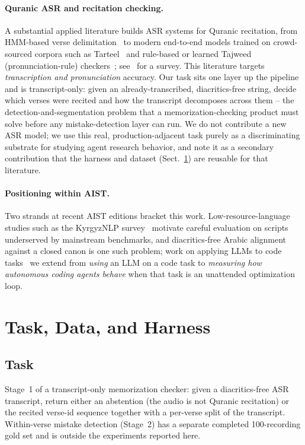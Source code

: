 \documentclass[runningheads]{llncs}
\begin{document}
\paragraph{Quranic ASR and recitation checking.}
A substantial applied literature builds ASR systems for Quranic
recitation, from HMM-based verse delimitation~\cite{tabbal2006recitation} to
modern end-to-end models trained on crowd-sourced corpora such as
Tarteel~\cite{yousfi2018tarteel,alharbi2026comparative} and rule-based or
learned Tajweed (pronunciation-rule) checkers~\cite{alagrami2021smartajweed};
see~\cite{farghaly2021asrreview} for a survey. This literature targets
\emph{transcription and pronunciation} accuracy. Our task sits one layer up
the pipeline and is transcript-only: given an already-transcribed,
diacritics-free string, decide which verses were recited and how the
transcript decomposes across them -- the detection-and-segmentation problem
that a memorization-checking product must solve before any mistake-detection
layer can run. We do not contribute a new ASR model; we use this real,
production-adjacent task purely as a discriminating substrate for studying
agent research behavior, and note it as a secondary contribution that the
harness and dataset (Sect.~\ref{sec:harness}) are reusable for that
literature.

\paragraph{Positioning within AIST.}
Two strands at recent AIST editions bracket this work. Low-resource-language
studies such as the KyrgyzNLP survey~\cite{alekseev2025kyrgyznlp} motivate
careful evaluation on scripts underserved by mainstream benchmarks, and
diacritics-free Arabic alignment against a closed canon is one such problem;
work on applying LLMs to code tasks~\cite{andryushchenko2024codeqa} we extend
from \emph{using} an LLM on a code task to \emph{measuring how autonomous
coding agents behave} when that task is an unattended optimization loop.

\section{Task, Data, and Harness}
\label{sec:harness}

\subsection{Task}
Stage~1 of a transcript-only memorization checker: given a diacritics-free
ASR transcript, return either an abstention (the audio is not Quranic
recitation) or the recited verse-id sequence together with a per-verse split
of the transcript. Within-verse mistake detection (Stage~2) has a separate completed 100-recording gold set
and is outside the experiments reported here.
\end{document}
